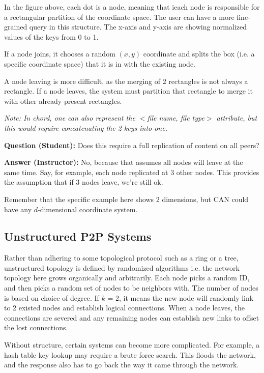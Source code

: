 \documentclass[twoside]{article}
\begin{document}
In the figure above, each dot is a node, meaning that ieach node is responsible for a rectangular partition of the coordinate space. The user can have a more fine-grained query in this structure. The x-axis and y-axis are showing normalized values of the keys from 0 to 1.

If a node joins, it chooses a random $(x,y)$ coordinate and splits the box (i.e. a specific coordinate space) that it is in with the existing node. 

A node leaving is more difficult, as the merging of 2 rectangles is not always a rectangle. If a node leaves, the system must partition that rectangle to merge it with other already present rectangles. 

\textit{Note: In chord, one can also represent the $<$file name, file type$>$ attribute, but this would require concatenating the 2 keys into one.}

\textbf{Question (Student): } Does this require a full replication of content on all peers?

\textbf{Answer (Instructor): } No, because that assumes all nodes will leave at the same time. Say, for example, each node replicated at 3 other nodes. This provides the assumption that if 3 nodes leave, we're still ok.

Remember that the specific example here shows 2 dimensions, but CAN could have any $d$-dimensional coordinate system.


\subsection{Unstructured P2P Systems}

Rather than adhering to some topological protocol such as a ring or a tree, unstructured topology is defined by randomized algorithms i.e. the network topology here grows organically and arbitrarily. Each node picks a random ID, and then picks a random set of nodes to be neighbors with. The number of nodes is based on choice of degree. If $k$ = 2, it means the new node will randomly link to 2 existed nodes and establish logical connections. When a node leaves, the connections are severed and any remaining nodes can establish new links to offset the lost connections.

Without structure, certain systems can become more complicated. For example, a hash table key lookup may require a brute force search. This floods the network, and the response also has to go back the way it came through the network.
\end{document}
